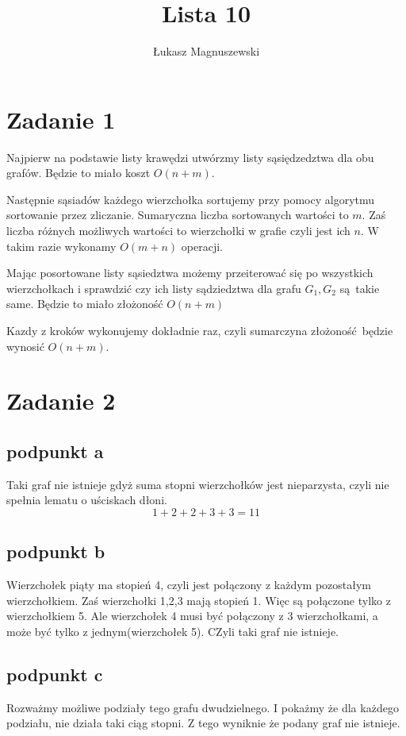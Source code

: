 \documentclass{article}
\title{Lista 10}
\author{Łukasz Magnuszewski}
\date{\vspace{-5ex}}
\begin{document}
\maketitle
\section*{Zadanie 1}
Najpierw na podstawie listy krawędzi utwórzmy listy sąsiędzedztwa dla obu grafów. 
Będzie to miało koszt $O(n+m)$. 

Następnie sąsiadów każdego wierzchołka sortujemy przy pomocy algorytmu sortowanie przez zliczanie. Sumaryczna liczba sortowanych wartości to $m$. Zaś liczba różnych możliwych wartości to wierzchołki w grafie czyli jest ich $n$. W takim razie wykonamy $O(m+n)$ operacji.

Mając posortowane listy sąsiedztwa możemy przeiterować się po wszystkich wierzchołkach i sprawdzić czy ich listy sądziedztwa dla grafu $G_1, G_2$ są takie same. Będzie to miało złożoność $O(n+m)$

Kazdy z kroków wykonujemy dokładnie raz, czyli sumarczyna złożoność będzie wynosić $O(n+m)$.


\section*{Zadanie 2}
\subsection*{podpunkt a}
Taki graf nie istnieje gdyż suma stopni wierzchołków jest nieparzysta, czyli nie spełnia lematu o uściskach dłoni.
\[
  1+2+2+3+3=11
\]

\subsection*{podpunkt b}
Wierzchołek piąty ma stopień 4, czyli jest połączony z każdym pozostałym wierzchołkiem. Zaś wierzchołki 1,2,3 mają stopień 1. Więc są połączone tylko z wierzchołkiem 5. Ale wierzchołek 4 musi być połączony z 3 wierzchołkami, a może być tylko z jednym(wierzchołek 5). CZyli taki graf nie istnieje.

\subsection*{podpunkt c}
Rozważmy możliwe podziały tego grafu dwudzielnego. I pokażmy że dla każdego podziału, nie działa taki ciąg stopni. Z tego wyniknie że podany graf nie istnieje.
\end{document}
